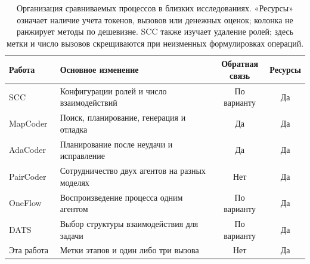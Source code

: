 \begin{table}[H]
\caption{Организация сравниваемых процессов в близких исследованиях. «Ресурсы» означает наличие учета токенов, вызовов или денежных оценок; колонка не ранжирует методы по дешевизне. SCC также изучает удаление ролей; здесь метки и число вызовов скрещиваются при неизменных формулировках операций.}
\label{tab:related-designs}
\centering\small
\begin{tabularx}{\linewidth}{@{}l>{\raggedright\arraybackslash}Xcc@{}}
\toprule
Работа & Основное изменение & \shortstack{Обратная\\связь} & Ресурсы\\
\midrule
SCC~\cite{dong2023selfcollaboration} & Конфигурации ролей и число взаимодействий & По варианту & Да\\
\addlinespace
MapCoder~\cite{islam2024mapcoder} & Поиск, планирование, генерация и отладка & Да & Да\\
\addlinespace
AdaCoder~\cite{zhu2026adacoder} & Планирование после неудачи и исправление & Да & Да\\
\addlinespace
PairCoder~\cite{chen2026paircoder} & Сотрудничество двух агентов на разных моделях & Нет & Да\\
\addlinespace
OneFlow~\cite{xu2026oneflow} & Воспроизведение процесса одним агентом & По варианту & Да\\
\addlinespace
DATS~\cite{hong2026dats} & Выбор структуры взаимодействия для задачи & По варианту & Да\\
\addlinespace
Эта работа & Метки этапов и один либо три вызова & Нет & Да\\
\bottomrule
\end{tabularx}
\end{table}

